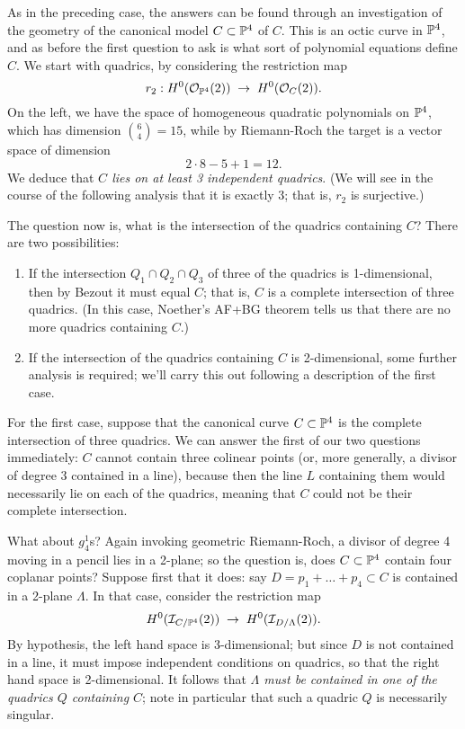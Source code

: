 \documentclass[12pt, leqno]{article}
\begin{document}
As in the preceding case, the answers can be found through an investigation of the geometry of the canonical model $C \subset {\mathbb P}^4$ of $C$. This is an octic curve in ${\mathbb P}^4$, and as before the first question to ask is what sort of polynomial equations define $C$. We start with quadrics, by considering the restriction map
$$
r_2 : H^0({\mathcal O}_{{\mathbb P}^4}(2)) \; \to \; H^0({\mathcal O}_{C}(2)).
$$
On the left, we have the space of homogeneous quadratic polynomials on ${\mathbb P}^4$, which has dimension $\binom{6}{4} = 15$, while by Riemann-Roch the target is a vector space of dimension
$$
2\cdot8 - 5 + 1 = 12.
$$
We deduce that \emph{$C$ lies on at least 3 independent quadrics}. (We will see in the course of the following analysis that it is exactly 3; that is, $r_2$ is surjective.)

The question now is, what is the intersection of the quadrics containing $C$? There are two possibilities:

\begin{enumerate}
\item If the intersection $Q_1 \cap Q_2 \cap Q_3$ of three of the quadrics is 1-dimensional, then by Bezout it must equal $C$; that is, $C$ is a complete intersection of three quadrics. (In this case, Noether's AF+BG theorem tells us that there are no more quadrics containing $C$.)
\item If the intersection of the quadrics containing $C$ is 2-dimensional, some further analysis is required; we'll carry this out following a description of the first case.
\end{enumerate}

For the first case, suppose that the canonical curve $C \subset {\mathbb P}^4$ is the complete intersection of three quadrics. We can answer the first of our two questions immediately: $C$ cannot contain three colinear points (or, more generally, a divisor of degree 3 contained in a line), because then the line $L$ containing them would necessarily lie on each of the quadrics, meaning that $C$ could not be their complete intersection.

What about $g^1_4$s? Again invoking geometric Riemann-Roch, a divisor of degree 4 moving in a pencil lies in a 2-plane; so the question is, does $C \subset {\mathbb P}^4$ contain four coplanar points? Suppose first that it does: say $D = p_1+\dots +p_4 \subset C$ is contained in a 2-plane $\Lambda$. In that case, consider the restriction map
$$
H^0({\mathcal I}_{C/{\mathbb P}^4}(2)) \; \to \; H^0({\mathcal I}_{D/\Lambda}(2)).
$$
By hypothesis, the left hand space is 3-dimensional; but since $D$ is not contained in a line, it must impose independent conditions on quadrics, so that the right hand space is 2-dimensional. It follows that \emph{$\Lambda$ must be contained in one of the quadrics $Q$ containing $C$}; note in particular that such a quadric $Q$ is necessarily singular.
\end{document}
